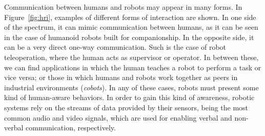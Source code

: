 Communication between humans and robots may appear in many forms. In Figure~\ref{fig:hri}, examples of different forms of interaction are shown. In one side of the spectrum, it can mimic communication between humans, as it can be seen in the case of humanoid robots built for companionship. In the opposite side, it can be a very direct one-way communication. Such is the case of robot teleoperation, where the human acts as supervisor or operator. In between these, we can find applications in which the human teaches a robot to perform a task or vice versa; or those in which humans and robots work together as peers in industrial environments (\emph{cobots}). In any of these cases, robots must present some kind of human-aware behaviors. In order to gain this kind of awareness, robotic systems rely on the streams of data provided by their sensors, being the most common audio and video signals, which are used for enabling verbal and non-verbal communication, respectively. 

